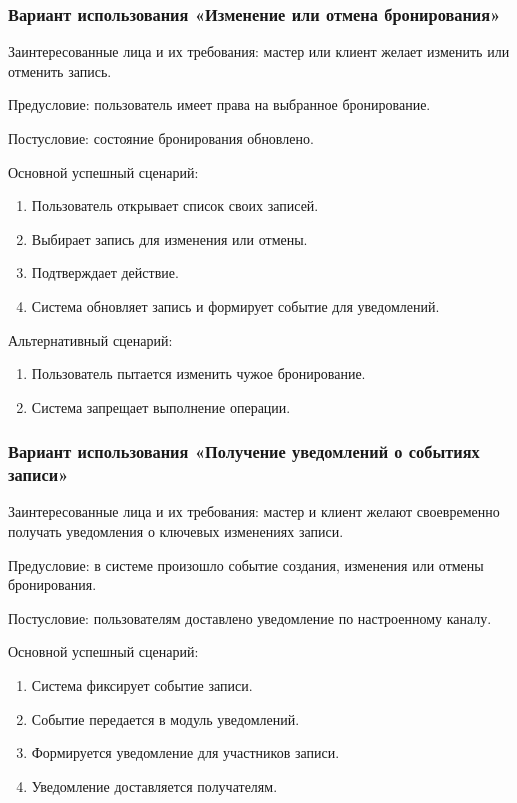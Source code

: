 \subsubsection{Вариант использования «Изменение или отмена бронирования»}

Заинтересованные лица и их требования: мастер или клиент желает изменить или отменить запись.

Предусловие: пользователь имеет права на выбранное бронирование.

Постусловие: состояние бронирования обновлено.

Основной успешный сценарий:
\begin{enumerate}
\item Пользователь открывает список своих записей.
\item Выбирает запись для изменения или отмены.
\item Подтверждает действие.
\item Система обновляет запись и формирует событие для уведомлений.
\end{enumerate}

Альтернативный сценарий:
\begin{enumerate}
\item Пользователь пытается изменить чужое бронирование.
\item Система запрещает выполнение операции.
\end{enumerate}

\subsubsection{Вариант использования «Получение уведомлений о событиях записи»}

Заинтересованные лица и их требования: мастер и клиент желают своевременно получать уведомления о ключевых изменениях записи.

Предусловие: в системе произошло событие создания, изменения или отмены бронирования.

Постусловие: пользователям доставлено уведомление по настроенному каналу.

Основной успешный сценарий:
\begin{enumerate}
\item Система фиксирует событие записи.
\item Событие передается в модуль уведомлений.
\item Формируется уведомление для участников записи.
\item Уведомление доставляется получателям.
\end{enumerate}

